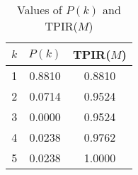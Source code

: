\begin{table}[H]\centering\scriptsize
\caption{Values of $P(k)$ and TPIR($M$)}\label{tab:pk_tpir}
\begin{tabular}{@{}rcc@{}}\toprule
$k$ & $P(k)$ & TPIR($M$)\\ \midrule
1 & 0.8810 & 0.8810 \\
2 & 0.0714 & 0.9524 \\
3 & 0.0000 & 0.9524 \\
4 & 0.0238 & 0.9762 \\
5 & 0.0238 & 1.0000 \\
\bottomrule\end{tabular}\end{table}
